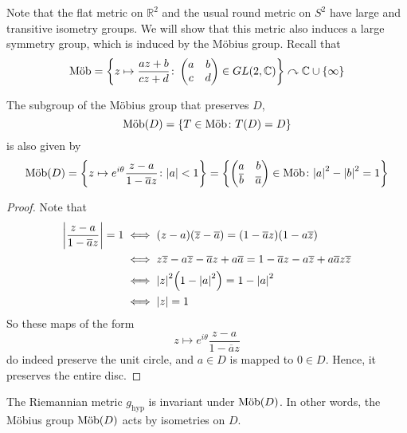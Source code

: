 Note that the flat metric on \( \mathbb R^2 \) and the usual round metric on \( S^2 \) have large and transitive isometry groups.
We will show that this metric also induces a large symmetry group, which is induced by the M\"obius group.
Recall that
\[
	\text{M\"ob} = \qty{z \mapsto \frac{az+b}{cz+d} \colon \begin{pmatrix}
			a & b \\
			c & d
		\end{pmatrix} \in GL(2,\mathbb C)} \curvearrowright \mathbb C \cup \qty{\infty}
\]
\begin{lemma}
	The subgroup of the M\"obius group that preserves \( D \),
	\[
		\text{M\"ob}(D) = \qty{T \in \text{M\"ob}\colon T(D) = D}
	\]
	is also given by
	\[
		\text{M\"ob}(D) = \qty{z \mapsto e^{i\theta} \frac{z-a}{1-\overline a z} \colon \abs{a} < 1} = \qty{\begin{pmatrix}
				a           & b           \\
				\overline b & \overline a
			\end{pmatrix} \in \text{M\"ob}\colon \abs{a}^2 - \abs{b}^2 = 1}
	\]
\end{lemma}
\begin{proof}
	Note that
	\begin{align*}
		\abs{\frac{z-a}{1-\overline a z}} = 1 & \iff (z-a)(\overline z - \overline a) = (1 - \overline a z)(1 - a \overline z)                                                     \\
		                                      & \iff z\overline z - a\overline z - \overline a z + a \overline a = 1 - \overline a z - a \overline z + a \overline a z \overline z \\
		                                      & \iff \abs{z}^2\qty(1 - \abs{a}^2) = 1 - \abs{a}^2                                                                                  \\
		                                      & \iff \abs{z} = 1
	\end{align*}
	So these maps of the form
	\[
		z \mapsto e^{i\theta} \frac{z-a}{1-\overline a z}
	\]
	do indeed preserve the unit circle, and \( a \in D \) is mapped to \( 0 \in D \).
	Hence, it preserves the entire disc.
\end{proof}
\begin{lemma}
	The Riemannian metric \( g_{\text{hyp}} \) is invariant under \( \text{M\"ob}(D) \).
	In other words, the M\"obius group \( \text{M\"ob}(D) \) acts by isometries on \( D \).
\end{lemma}
